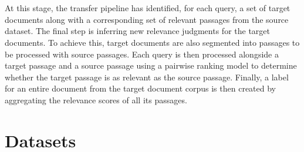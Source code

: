 \\\\
At this stage, the transfer pipeline has identified, for each query, a set of target documents along with a corresponding set of relevant passages from the source dataset. The final step is inferring new relevance judgments for the target documents. To achieve this, target documents are also segmented into passages to be processed with source passages. Each query is then processed alongside a target passage and a source passage using a pairwise ranking model to determine whether the target passage is as relevant as the source passage. Finally, a label for an entire document from the target document corpus is then created by aggregating the relevance scores of all its passages.

\section{Datasets}\label{datasets}

